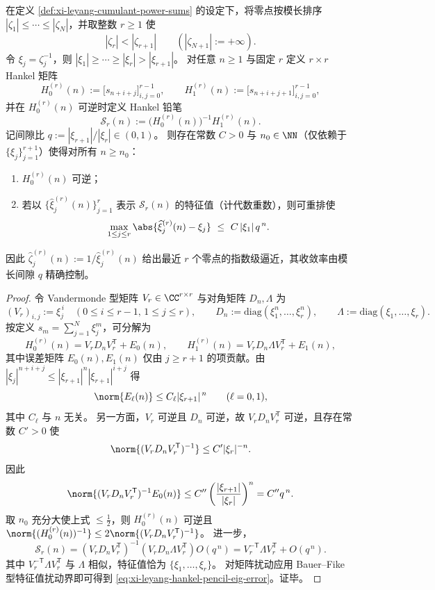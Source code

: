 \begin{theorem}\label{thm:xi-leyang-hankel-pencil-dominant-zeros}
在定义 \ref{def:xi-leyang-cumulant-power-sums} 的设定下，将零点按模长排序 \(|\zeta_1|\le\cdots\le|\zeta_N|\)，并取整数 \(r\ge 1\) 使
\[
|\zeta_r|<|\zeta_{r+1}|\qquad (|\zeta_{N+1}|:=+\infty).
\]
令 \(\xi_j=\zeta_j^{-1}\)，则
\(
|\xi_1|\ge\cdots\ge|\xi_r|>|\xi_{r+1}|
\)。
对任意 \(n\ge 1\) 与固定 \(r\) 定义 \(r\times r\) Hankel 矩阵
\[
H_0^{(r)}(n):=\bigl[s_{n+i+j}\bigr]_{i,j=0}^{r-1},
\qquad
H_1^{(r)}(n):=\bigl[s_{n+i+j+1}\bigr]_{i,j=0}^{r-1},
\]
并在 \(H_0^{(r)}(n)\) 可逆时定义 Hankel 铅笔
\[
\mathcal{S}_r(n):=\bigl(H_0^{(r)}(n)\bigr)^{-1}H_1^{(r)}(n).
\]
记间隙比
\(
q:=|\xi_{r+1}|/|\xi_r|\in(0,1)
\)。
则存在常数 \(C>0\) 与 \(n_0\in\NN\)（仅依赖于 \(\{\xi_j\}_{j=1}^{r+1}\)）使得对所有 \(n\ge n_0\)：
\begin{enumerate}
  \item \(H_0^{(r)}(n)\) 可逆；
  \item 若以 \(\{\widehat\xi_j^{(r)}(n)\}_{j=1}^r\) 表示 \(\mathcal{S}_r(n)\) 的特征值（计代数重数），则可重排使
  \begin{equation}\label{eq:xi-leyang-hankel-pencil-eig-error}
  \max_{1\le j\le r}\abs{\widehat\xi_j^{(r)}(n)-\xi_j}\ \le\ C\,|\xi_1|\,q^{\,n}.
  \end{equation}
\end{enumerate}
因此 \(\widehat\zeta_j^{(r)}(n):=1/\widehat\xi_j^{(r)}(n)\) 给出最近 \(r\) 个零点的指数级逼近，其收敛率由模长间隙 \(q\) 精确控制。
\end{theorem}
\begin{proof}
令 Vandermonde 型矩阵 \(V_r\in\CC^{r\times r}\) 与对角矩阵 \(D_n,\Lambda\) 为
\[
(V_r)_{i,j}:=\xi_j^{\,i}\quad(0\le i\le r-1,\,1\le j\le r),\qquad
D_n:=\mathrm{diag}(\xi_1^n,\dots,\xi_r^n),\qquad
\Lambda:=\mathrm{diag}(\xi_1,\dots,\xi_r).
\]
按定义 \(s_m=\sum_{j=1}^N\xi_j^m\)，可分解为
\[
H_0^{(r)}(n)=V_rD_nV_r^{\mathsf T}+E_0(n),\qquad
H_1^{(r)}(n)=V_rD_n\Lambda V_r^{\mathsf T}+E_1(n),
\]
其中误差矩阵 \(E_0(n),E_1(n)\) 仅由 \(j\ge r+1\) 的项贡献。由 \(|\xi_j|^{n+i+j}\le |\xi_{r+1}|^{n}|\xi_{r+1}|^{i+j}\) 得
\[
\norm{E_\ell(n)}\le C_\ell |\xi_{r+1}|^{\,n}\qquad(\ell=0,1),
\]
其中 \(C_\ell\) 与 \(n\) 无关。
另一方面，\(V_r\) 可逆且 \(D_n\) 可逆，故 \(V_rD_nV_r^{\mathsf T}\) 可逆，且存在常数 \(C'>0\) 使
\[
\norm{(V_rD_nV_r^{\mathsf T})^{-1}}\le C'|\xi_r|^{-n}.
\]
因此
\[
\norm{(V_rD_nV_r^{\mathsf T})^{-1}E_0(n)}\le C''\left(\frac{|\xi_{r+1}|}{|\xi_r|}\right)^{n}=C''q^{\,n}.
\]
取 \(n_0\) 充分大使上式 \(\le \tfrac12\)，则 \(H_0^{(r)}(n)\) 可逆且
\(
\norm{(H_0^{(r)}(n))^{-1}}\le 2\norm{(V_rD_nV_r^{\mathsf T})^{-1}}
\)。
进一步，
\[
\mathcal{S}_r(n)
=(V_rD_nV_r^{\mathsf T})^{-1}(V_rD_n\Lambda V_r^{\mathsf T})
O(q^{\,n})
=V_r^{-{\mathsf T}}\Lambda V_r^{\mathsf T}+O(q^{\,n}).
\]
其中 \(V_r^{-{\mathsf T}}\Lambda V_r^{\mathsf T}\) 与 \(\Lambda\) 相似，特征值恰为 \(\{\xi_1,\dots,\xi_r\}\)。
对矩阵扰动应用 Bauer--Fike 型特征值扰动界即可得到 \eqref{eq:xi-leyang-hankel-pencil-eig-error}。证毕。
\end{proof}

